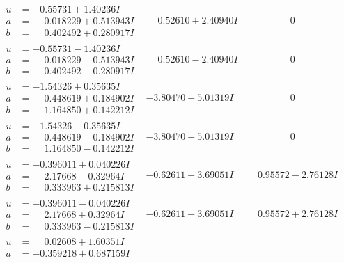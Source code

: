 \documentclass[1p]{elsarticle_modified}
\theoremstyle{definition}
\begin{document}
$$\begin{array}{c|c|c}
 \hline 
\begin{aligned}
u &= -0.55731 + 1.40236 I \\
a &= \phantom{-}0.018229 + 0.513943 I \\
b &= \phantom{-}0.402492 + 0.280917 I\end{aligned}
 & \phantom{-}0.52610 + 2.40940 I & \phantom{-0.000000 } 0 \\ \hline\begin{aligned}
u &= -0.55731 - 1.40236 I \\
a &= \phantom{-}0.018229 - 0.513943 I \\
b &= \phantom{-}0.402492 - 0.280917 I\end{aligned}
 & \phantom{-}0.52610 - 2.40940 I & \phantom{-0.000000 } 0 \\ \hline\begin{aligned}
u &= -1.54326 + 0.35635 I \\
a &= \phantom{-}0.448619 + 0.184902 I \\
b &= \phantom{-}1.164850 + 0.142212 I\end{aligned}
 & -3.80470 + 5.01319 I & \phantom{-0.000000 } 0 \\ \hline\begin{aligned}
u &= -1.54326 - 0.35635 I \\
a &= \phantom{-}0.448619 - 0.184902 I \\
b &= \phantom{-}1.164850 - 0.142212 I\end{aligned}
 & -3.80470 - 5.01319 I & \phantom{-0.000000 } 0 \\ \hline\begin{aligned}
u &= -0.396011 + 0.040226 I \\
a &= \phantom{-}2.17668 - 0.32964 I \\
b &= \phantom{-}0.333963 + 0.215813 I\end{aligned}
 & -0.62611 + 3.69051 I & \phantom{-}0.95572 - 2.76128 I \\ \hline\begin{aligned}
u &= -0.396011 - 0.040226 I \\
a &= \phantom{-}2.17668 + 0.32964 I \\
b &= \phantom{-}0.333963 - 0.215813 I\end{aligned}
 & -0.62611 - 3.69051 I & \phantom{-}0.95572 + 2.76128 I \\ \hline\begin{aligned}
u &= \phantom{-}0.02608 + 1.60351 I \\
a &= -0.359218 + 0.687159 I \\

\end{aligned}
\end{array}$$
\end{document}
